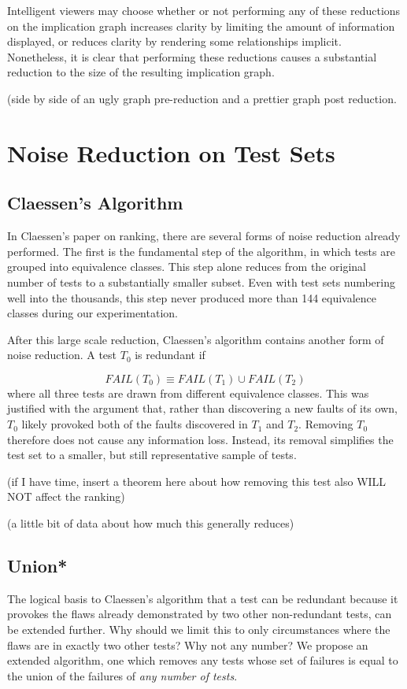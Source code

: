\documentclass[11pt]{article}
\begin{document}
Intelligent viewers may choose whether or not performing any of these reductions on the implication graph increases clarity by limiting the amount of information displayed, or reduces clarity by rendering some relationships implicit. Nonetheless, it is clear that performing these reductions causes a substantial reduction to the size of the resulting implication graph.

(side by side of an ugly graph pre-reduction and a prettier graph post reduction.

\section{Noise Reduction on Test Sets}
\subsection{Claessen's Algorithm}
In Claessen's paper on ranking, there are several forms of noise reduction already performed. The first is the fundamental step of the algorithm, in which tests are grouped into equivalence classes. This step alone reduces from the original number of tests to a substantially smaller subset. Even with test sets numbering well into the thousands, this step never produced more than 144 equivalence classes during our experimentation.

After this large scale reduction, Claessen's algorithm contains another form of noise reduction. A test $T_0$ is redundant if

$$FAIL (T_0) \equiv FAIL(T_1) \cup FAIL(T_2)$$
where all three tests are drawn from different equivalence classes. This was justified with the argument that, rather than discovering a new faults of its own, $T_0$ likely provoked both of the faults discovered in $T_1$ and $T_2$. Removing $T_0$ therefore does not cause any information loss. Instead, its removal simplifies the test set to a smaller, but still representative sample of tests.

(if I have time, insert a theorem here about how removing this test also WILL NOT affect the ranking)

(a little bit of data about how much this generally reduces)

\subsection{Union*}
The logical basis to Claessen's algorithm that a test can be redundant because it provokes the flaws already demonstrated by two other non-redundant tests\cite{Claessen}, can be extended further. Why should we limit this to only circumstances where the flaws are in exactly two other tests? Why not any number? We propose an extended algorithm, one which removes any tests whose set of failures is equal to the union of the failures of \emph{any number of tests}. 
\end{document}

